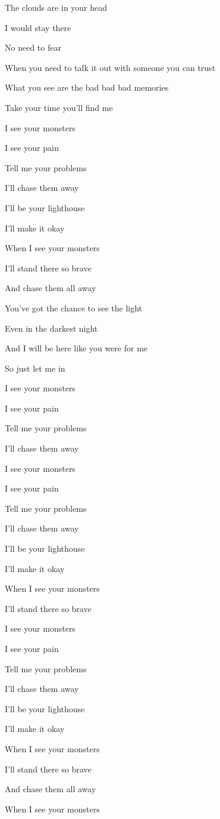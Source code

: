 \documentclass[]{ctexbook}
\begin{document}
The clouds are in your head

I would stay there

No need to fear

When you need to talk it out with someone you can trust

What you see are the bad bad bad memories

Take your time you'll find me

I see your monsters

I see your pain

Tell me your problems

I'll chase them away

I'll be your lighthouse

I'll make it okay

When I see your monsters

I'll stand there so brave

And chase them all away

You've got the chance to see the light

Even in the darkest night

And I will be here like you were for me

So just let me in

I see your monsters

I see your pain

Tell me your problems

I'll chase them away

I see your monsters

I see your pain

Tell me your problems

I'll chase them away

I'll be your lighthouse

I'll make it okay

When I see your monsters

I'll stand there so brave

I see your monsters

I see your pain

Tell me your problems

I'll chase them away

I'll be your lighthouse

I'll make it okay

When I see your monsters

I'll stand there so brave

And chase them all away

When I see your monsters
\end{document}
